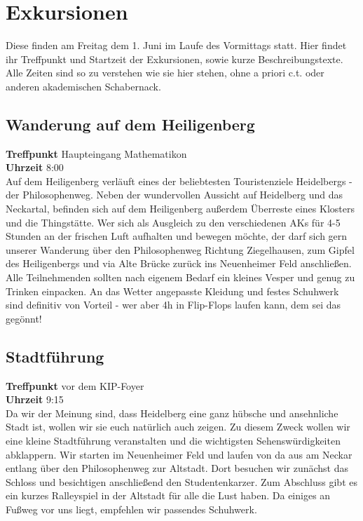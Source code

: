 
\section*{Exkursionen}

Diese finden am Freitag dem 1. Juni im Laufe des Vormittags statt.
Hier findet ihr Treffpunkt und Startzeit der Exkursionen, sowie kurze Beschreibungstexte.
Alle Zeiten sind so zu verstehen wie sie hier stehen, ohne a priori c.t. oder anderen akademischen Schabernack.

\subsection*{Wanderung auf dem Heiligenberg}
\textbf{Treffpunkt} Haupteingang Mathematikon\\
\textbf{Uhrzeit} 8:00\\
Auf dem Heiligenberg verläuft eines der beliebtesten Touristenziele Heidelbergs - der Philosophenweg. Neben der wundervollen Aussicht auf Heidelberg und das Neckartal, befinden sich auf dem Heiligenberg außerdem Überreste eines Klosters und die Thingstätte. Wer sich als Ausgleich zu den verschiedenen AKs für 4-5 Stunden an der frischen Luft aufhalten und bewegen möchte, der darf sich gern unserer Wanderung über den Philosophenweg Richtung Ziegelhausen, zum Gipfel des Heiligenbergs und via Alte Brücke zurück ins Neuenheimer Feld anschließen. Alle Teilnehmenden sollten nach eigenem Bedarf ein kleines Vesper und genug zu Trinken einpacken. An das Wetter angepasste Kleidung und festes Schuhwerk sind definitiv von Vorteil - wer aber 4h in Flip-Flops laufen kann, dem sei das gegönnt! 

\subsection*{Stadtführung}
\textbf{Treffpunkt} vor dem KIP-Foyer\\
\textbf{Uhrzeit} 9:15\\
Da wir der Meinung sind, dass Heidelberg eine ganz hübsche und ansehnliche Stadt ist, wollen wir sie euch natürlich auch zeigen. Zu diesem Zweck wollen wir eine kleine Stadtführung veranstalten und die wichtigsten Sehenswürdigkeiten abklappern. Wir starten im  Neuenheimer Feld und laufen von da aus am Neckar entlang über den Philosophenweg zur Altstadt. Dort besuchen wir zunächst das Schloss und besichtigen anschließend den Studentenkarzer. Zum Abschluss gibt es ein kurzes Ralleyspiel in der Altstadt für alle die Lust haben. Da einiges an Fußweg vor uns liegt, empfehlen wir passendes Schuhwerk. 


